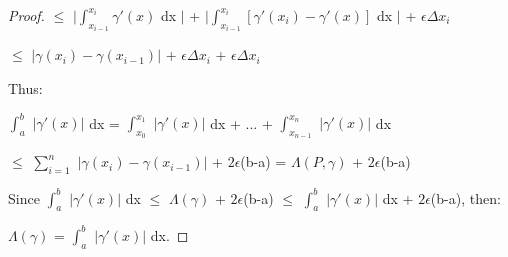 \begin{proof}
        \hspace{3.3cm}
        $\leq$ $|\int_{x_{i-1}}^{x_i} \gamma'(x)$ dx $|$
                + $|\int_{x_{i-1}}^{x_i} [\gamma'(x_i) - \gamma'(x)]$ dx $|$
                + $\epsilon \Delta x_i$

        \hspace{3.3cm}
        $\leq$ $|\gamma(x_i) - \gamma(x_{i-1})|$
            + $\epsilon \Delta x_i$
            + $\epsilon \Delta x_i$

        Thus:

        \hspace{0.5cm}
        $\int_a^b$ $|\gamma'(x)|$ dx
        = $\int_{x_0}^{x_1}$ $|\gamma'(x)|$ dx
            + ... + $\int_{x_{n-1}}^{x_n}$ $|\gamma'(x)|$ dx

        \hspace{2.9cm}
        $\leq$ $\sum_{i=1}^n$ $|\gamma(x_i) - \gamma(x_{i-1})|$ + $2\epsilon$(b-a)
        = $\Lambda(P,\gamma)$ + $2\epsilon$(b-a)

        Since
        $\int_a^b$ $|\gamma'(x)|$ dx
        $\leq$ $\Lambda(\gamma)$ + $2\epsilon$(b-a)
        $\leq$ $\int_a^b$ $|\gamma'(x)|$ dx + $2\epsilon$(b-a),
        then:
        
        \hspace{0.5cm}
        $\Lambda(\gamma)$ = $\int_a^b$ $|\gamma'(x)|$ dx.        
    \end{proof}




    